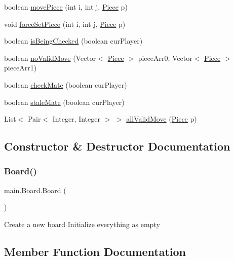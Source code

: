 \begin{DoxyCompactItemize}
\item 
boolean \mbox{\hyperlink{classmain_1_1_board_a6652d7432f1ce0fa3592d5de0758d7af}{move\+Piece}} (int i, int j, \mbox{\hyperlink{classmain_1_1_piece}{Piece}} p)
\item 
void \mbox{\hyperlink{classmain_1_1_board_a80aa0a6c0d224089311d78da4e198222}{force\+Set\+Piece}} (int i, int j, \mbox{\hyperlink{classmain_1_1_piece}{Piece}} p)
\item 
boolean \mbox{\hyperlink{classmain_1_1_board_a46af849ead21cb70f0b5125ad990925c}{is\+Being\+Checked}} (boolean cur\+Player)
\item 
boolean \mbox{\hyperlink{classmain_1_1_board_a3f7094db01378606fd6860ffab0377bf}{no\+Valid\+Move}} (Vector$<$ \mbox{\hyperlink{classmain_1_1_piece}{Piece}} $>$ piece\+Arr0, Vector$<$ \mbox{\hyperlink{classmain_1_1_piece}{Piece}} $>$ piece\+Arr1)
\item 
boolean \mbox{\hyperlink{classmain_1_1_board_af3cc799b67b0c5d781b605d8d40d2ecf}{check\+Mate}} (boolean cur\+Player)
\item 
boolean \mbox{\hyperlink{classmain_1_1_board_a907a1f26384edaa20589e7f58f903bf7}{stale\+Mate}} (boolean cur\+Player)
\item 
List$<$ Pair$<$ Integer, Integer $>$ $>$ \mbox{\hyperlink{classmain_1_1_board_ab71b56cf4b3f302460d5be49116e3317}{all\+Valid\+Move}} (\mbox{\hyperlink{classmain_1_1_piece}{Piece}} p)
\end{DoxyCompactItemize}


\subsection{Constructor \& Destructor Documentation}
\mbox{\label{classmain_1_1_board_ac64a3f3f09655e7a7c8d357571a0cdf9}} 
\subsubsection{\texorpdfstring{Board()}{Board()}}
{\footnotesize\ttfamily main.\+Board.\+Board (\begin{DoxyParamCaption}{ }\end{DoxyParamCaption})\hspace{0.3cm}{\ttfamily [inline]}}

Create a new board Initialize everything as empty 

\subsection{Member Function Documentation}
\mbox{\label{classmain_1_1_board_a285ab1b37126a791616a59026d405e72}} 
